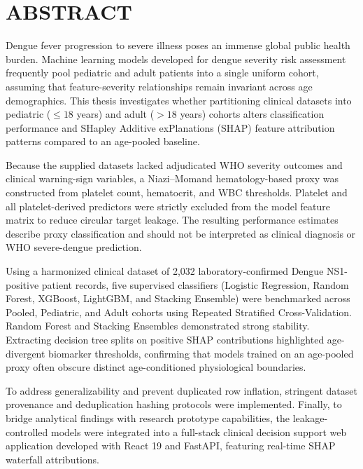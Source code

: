 \documentclass[12pt, a4paper]{report}
\begin{document}
\chapter*{ABSTRACT}
Dengue fever progression to severe illness poses an immense global public health burden. Machine learning models developed for dengue severity risk assessment frequently pool pediatric and adult patients into a single uniform cohort, assuming that feature-severity relationships remain invariant across age demographics. This thesis investigates whether partitioning clinical datasets into pediatric ($\le 18$ years) and adult ($> 18$ years) cohorts alters classification performance and SHapley Additive exPlanations (SHAP) feature attribution patterns compared to an age-pooled baseline.

Because the supplied datasets lacked adjudicated WHO severity outcomes and clinical warning-sign variables, a Niazi--Momand hematology-based proxy was constructed from platelet count, hematocrit, and WBC thresholds. Platelet and all platelet-derived predictors were strictly excluded from the model feature matrix to reduce circular target leakage. The resulting performance estimates describe proxy classification and should not be interpreted as clinical diagnosis or WHO severe-dengue prediction.

Using a harmonized clinical dataset of 2,032 laboratory-confirmed Dengue NS1-positive patient records, five supervised classifiers (Logistic Regression, Random Forest, XGBoost, LightGBM, and Stacking Ensemble) were benchmarked across Pooled, Pediatric, and Adult cohorts using Repeated Stratified Cross-Validation. Random Forest and Stacking Ensembles demonstrated strong stability. Extracting decision tree splits on positive SHAP contributions highlighted age-divergent biomarker thresholds, confirming that models trained on an age-pooled proxy often obscure distinct age-conditioned physiological boundaries.

To address generalizability and prevent duplicated row inflation, stringent dataset provenance and deduplication hashing protocols were implemented. Finally, to bridge analytical findings with research prototype capabilities, the leakage-controlled models were integrated into a full-stack clinical decision support web application developed with React 19 and FastAPI, featuring real-time SHAP waterfall attributions.
\end{document}

